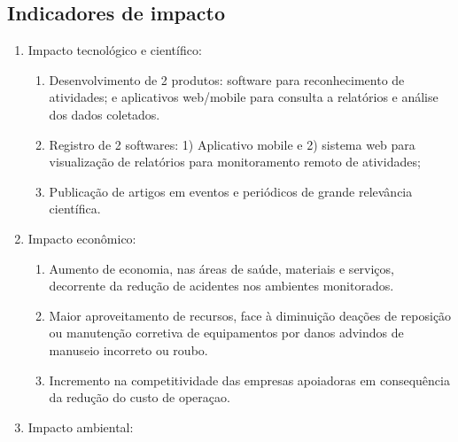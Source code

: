 \subsection{Indicadores de impacto}
\label{ssec:impact}
\begin{enumerate}
	\item Impacto tecnológico e científico:
		\begin{enumerate}
			\item Desenvolvimento de 2 produtos: software para reconhecimento de atividades; e aplicativos web/mobile para consulta a relatórios e análise dos dados coletados.
			\item Registro de 2 softwares: 1) Aplicativo mobile e 2) sistema web para visualização de relatórios para monitoramento remoto de atividades; 
			\item Publicação de artigos em eventos e periódicos de grande relevância científica.
		\end{enumerate}
	\item Impacto econômico:
		\begin{enumerate}
			\item Aumento de economia, nas áreas de saúde, materiais e serviços, decorrente da redução de acidentes nos ambientes monitorados.
			\item Maior aproveitamento de recursos, face à diminuição deações de reposição ou manutenção corretiva de equipamentos por danos advindos de manuseio incorreto ou roubo.
			\item Incremento na competitividade das empresas apoiadoras em consequência da redução do custo de operaçao.
		\end{enumerate}
	\item Impacto ambiental:
		\begin{enumerate}

\end{enumerate}
\end{enumerate}
